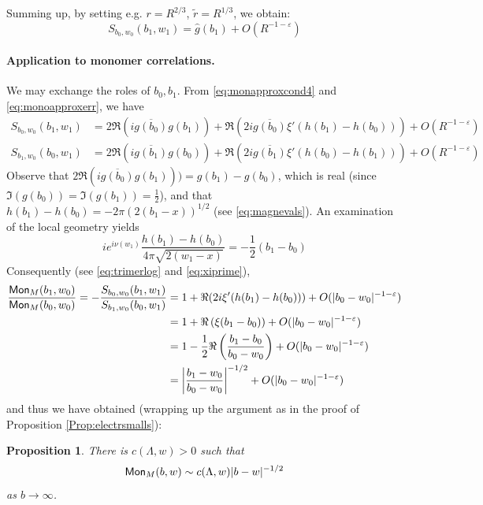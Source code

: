 \documentclass[10pt]{article}
\newcommand{\eps}{\varepsilon}
\newcommand{\Mon}{{\sf Mon}}
\newtheorem{Prop}[thm]{Proposition}
\begin{document}
Summing up, by setting e.g. $r=R^{2/3}$, $\tilde r=R^{1/3}$, we obtain:
\begin{equation}\label{eq:monoapproxerr}
S_{b_0,w_0}(b_1,w_1)=\hat g(b_1)+O(R^{-1-\eps})
\end{equation}

\paragraph{Application to monomer correlations.\\}
We may exchange the roles of $b_0,b_1$. From \eqref{eq:monapproxcond4} and \eqref{eq:monoapproxerr}, we have
\begin{equation}\label{eq:monapproxfinal}
\begin{split}
S_{b_0,w_0}(b_1,w_1)&=2\Re(i\overline {g(b_0)}g(b_1))+\Re\left(2i\overline{g(b_0)}\xi'(h(b_1)-h(b_0))\right)+O(R^{-1-\eps})\\
S_{b_1,w_0}(b_0,w_1)&=2\Re(i\overline {g(b_1)}g(b_0))+\Re\left(2i\overline{g(b_1)}\xi'(h(b_0)-h(b_1))\right)+O(R^{-1-\eps})
\end{split}
\end{equation}
Observe that $2\Re(i\overline {g(b_0)}g(b_1)))=g(b_1)-g(b_0)$, which is real (since $\Im(g(b_0))=\Im(g(b_1))=\frac 12$), and that $h(b_1)-h(b_0)=-2\pi (2(b_1-x))^{1/2}$ (see \eqref{eq:magnevals}). An examination of the local geometry yields 
$$ie^{i\nu(w_1)}\frac{h(b_1)-h(b_0)}{4\pi\sqrt{2(w_1-x)}}=-\frac 12(b_1-b_0)$$ Consequently (see \eqref{eq:trimerlog} and \eqref{eq:xiprime}),
\begin{align*}
\frac{\Mon_M(b_1,w_0)}{\Mon_M(b_0,w_0)}=-\frac{S_{b_0,w_0}(b_1,w_1)}{S_{b_1,w_0}(b_0,w_1)}&=1+\Re(2i\xi'(h(b_1)-h(b_0)))+O(|b_0-w_0|^{-1-\eps})\\
&=1+\Re\left(\xi(b_1-b_0)\right)+O(|b_0-w_0|^{-1-\eps})\\
&=1-\frac 12\Re\left(\frac{b_1-b_0}{b_0-w_0}\right)+O(|b_0-w_0|^{-1-\eps})\\
&=\left|\frac{b_1-w_0}{b_0-w_0}\right|^{-1/2}+O(|b_0-w_0|^{-1-\eps})
\end{align*}
and thus we have obtained (wrapping up the argument as in the proof of Proposition \ref{Prop:electrsmalls}):

\begin{Prop}\label{Prop:FS}
There is $c(\Lambda,w)>0$ such that
$$\Mon_M(b,w)\sim c(\Lambda,w)|b-w|^{-1/2}$$
as $b\rightarrow\infty$.
\end{Prop}
\end{document}
